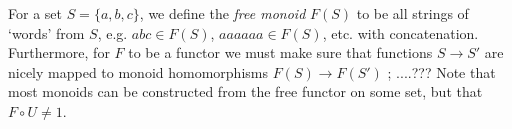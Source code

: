 For a set $S=\{a,b,c\}$, we define the \emph{free monoid} $F(S)$ to be all strings of `words' from $S$, e.g. $abc\in F(S)$, $aaaaaa\in F(S)$, etc. with concatenation. Furthermore, for $F$ to be a functor we must make sure that functions $S\to S'$ are nicely mapped to monoid homomorphisms $F(S)\to F(S')$ ; ....??? Note that most monoids can be constructed from the free functor on some set, but that $F\circ U\neq 1$.
